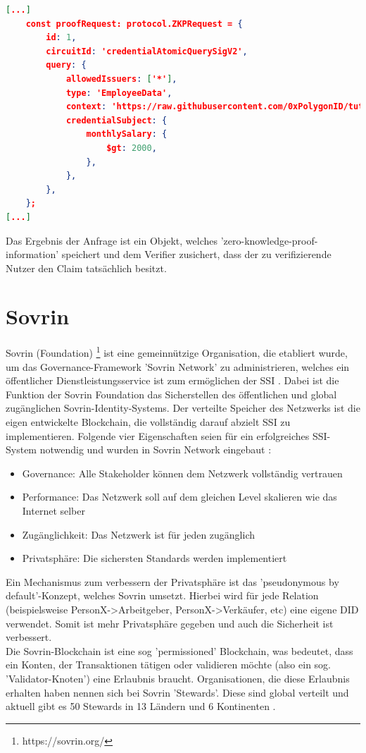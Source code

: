 \begin{lstlisting}[language=json,firstnumber=1]	
[...]
    const proofRequest: protocol.ZKPRequest = {
		id: 1,
		circuitId: 'credentialAtomicQuerySigV2',
		query: {
			allowedIssuers: ['*'],
			type: 'EmployeeData',
			context: 'https://raw.githubusercontent.com/0xPolygonID/tutorial-examples/main/credential-schema/schemas-examples/employee-data/employee-data.jsonld',
			credentialSubject: {
				monthlySalary: {
					$gt: 2000,
				},
			},
		},
	};
[...]
\end{lstlisting}
Das Ergebnis der Anfrage ist ein Objekt, welches 'zero-knowledge-proof-information' speichert und dem Verifier zusichert, dass der zu verifizierende Nutzer den Claim tatsächlich besitzt.

\section{Sovrin}
Sovrin (Foundation) \footnote{https://sovrin.org/} ist eine gemeinnützige Organisation, die etabliert wurde, um das Governance-Framework 'Sovrin Network' zu administrieren, welches ein öffentlicher Dienstleistungsservice ist zum ermöglichen der SSI \cite{ID39}. Dabei ist die Funktion der Sovrin Foundation das Sicherstellen des öffentlichen und global zugänglichen Sovrin-Identity-Systems.
Der verteilte Speicher des Netzwerks ist die eigen entwickelte Blockchain, die vollständig darauf abzielt SSI zu implementieren. Folgende vier Eigenschaften seien für ein erfolgreiches SSI-System notwendig und wurden in Sovrin Network eingebaut \cite{ID40}:
\begin{itemize}
	\item Governance: Alle Stakeholder können dem Netzwerk vollständig vertrauen
	\item Performance: Das Netzwerk soll auf dem gleichen Level skalieren wie das Internet selber
	\item Zugänglichkeit: Das Netzwerk ist für jeden zugänglich
	\item Privatsphäre: Die sichersten Standards werden implementiert
\end{itemize}
Ein Mechanismus zum verbessern der Privatsphäre ist das 'pseudonymous by default'-Konzept, welches Sovrin umsetzt. Hierbei wird für jede Relation (beispielsweise PersonX->Arbeitgeber, PersonX->Verkäufer, etc) eine eigene DID verwendet. Somit ist mehr Privatsphäre gegeben und auch die Sicherheit ist verbessert. \\
Die Sovrin-Blockchain ist eine sog 'permissioned' Blockchain, was bedeutet, dass ein Konten, der Transaktionen tätigen oder validieren möchte (also ein sog. 'Validator-Knoten') eine Erlaubnis braucht. Organisationen, die diese Erlaubnis erhalten haben nennen sich bei Sovrin 'Stewards'. Diese sind global verteilt und aktuell gibt es 50 Stewards in 13 Ländern und 6 Kontinenten \cite{ID43}. 
